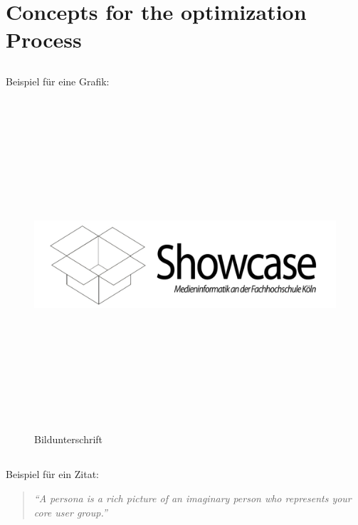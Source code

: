 \chapter{Concepts for the optimization Process}

\section{}
\label{sec:section}

Beispiel für eine Grafik:
\begin{figure}[!ht]
	\centering
		\includegraphics[width=1200pt, height=349pt, width=1.0\textwidth]{images/showcase.pdf}
	\caption{Bildunterschrift}
	\label{fig:showcase}
\end{figure}

\section{}
Beispiel für ein Zitat:
\begin{quotation}
	\textit{\enquote{A persona is a rich picture of an imaginary person who represents your core user group.}} \cite{Dix04}
\end{quotation}